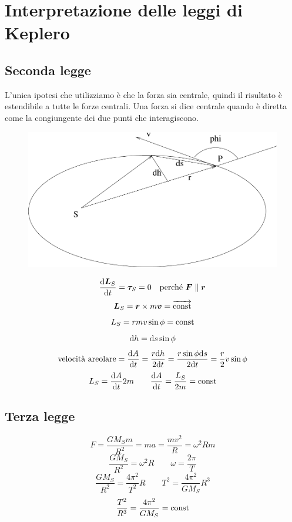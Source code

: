 \section{Interpretazione delle leggi di Keplero}
\subsection{Seconda legge}

L'unica ipotesi che utilizziamo è che la forza sia centrale,
quindi il risultato è estendibile a tutte le forze centrali. Una
forza si dice centrale quando è diretta come la congiungente dei
due punti che interagiscono.

\begin{figure}[htbp]
   \centering
   \includegraphics[scale=0.45]{immagini/fisica1/keplero}
\end{figure}



$$\frac{\mathrm{d}\boldsymbol{L}_S}{\mathrm{d} t}=\boldsymbol{\tau}_S=0\quad\text{perché }\boldsymbol{F}\parallel\boldsymbol{r}$$
\begin{equation*}\boldsymbol{L}_S=\boldsymbol{r}\times m\boldsymbol{v}=\overrightarrow{\text{const}}\end{equation*}
\begin{equation*}L_S=rmv\sin\phi={\text{const}}\end{equation*}
\begin{equation*}\mathrm{d} h=\mathrm{d} s\sin\phi\end{equation*}
$$\text{velocità areolare}=\frac{\mathrm{d} A}{\mathrm{d} t}=\frac{r\mathrm{d} h}{2\mathrm{d}
t}=\frac{r\sin\phi\mathrm{d} s}{2\mathrm{d} t}=\frac{r}{2}v\sin\phi$$
$$L_S=\frac{\mathrm{d} A}{\mathrm{d} t}2m\qquad\frac{\mathrm{d} A}{\mathrm{d}
t}=\frac{L_S}{2m}=\text{const}$$
\subsection{Terza legge}
\begin{equation*}F=\frac{GM_Sm}{R^2}=ma=\frac{mv^2}{R}=\omega^2Rm\end{equation*}
\begin{equation*}\frac{GM_S}{R^2}=\omega^2R\qquad \omega=\frac{2\pi}{T}\end{equation*}
$$\frac{GM_S}{R^2}=\frac{4\pi^2}{T^2}R\qquad
T^2=\frac{4\pi^2}{GM_S}R^3$$
\begin{equation*}\frac{T^2}{R^3}=\frac{4\pi^2}{GM_S}=\text{const}\end{equation*}

